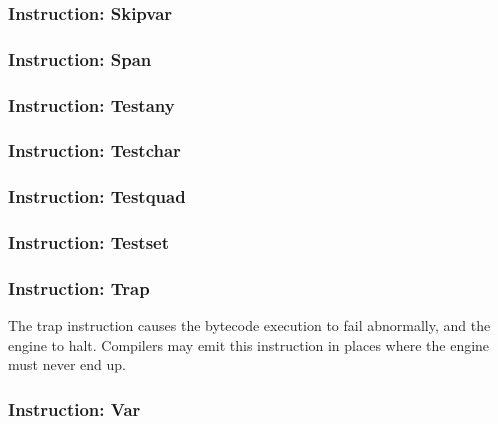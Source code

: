 \subsubsection{Instruction: Skipvar}

\subsubsection{Instruction: Span}

\subsubsection{Instruction: Testany}

\subsubsection{Instruction: Testchar}

\subsubsection{Instruction: Testquad}

\subsubsection{Instruction: Testset}

\subsubsection{Instruction: Trap}

The trap instruction causes the bytecode execution to fail abnormally,
and the engine to halt. Compilers may emit this instruction in places
where the engine must never end up.

\subsubsection{Instruction: Var}
